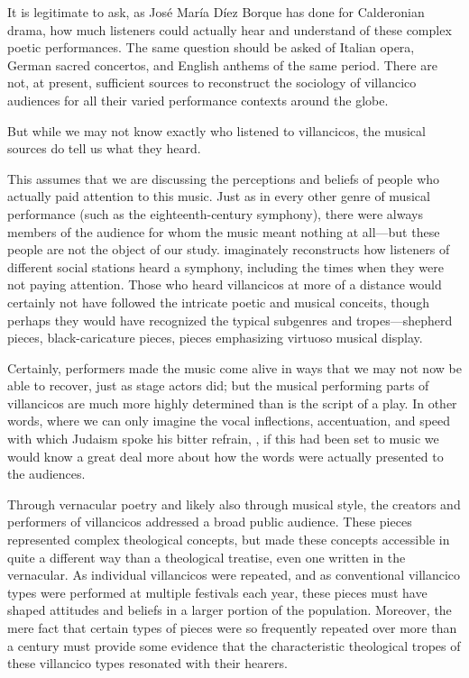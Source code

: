 It is legitimate to ask, as José María Díez Borque has done for Calderonian drama, how much listeners could actually hear and understand of these complex poetic performances.%
  \autocite{DiezBorque:Publico}
The same question should be asked of Italian opera, German sacred concertos, and English anthems of the same period.
There are not, at present, sufficient sources to reconstruct the sociology of villancico audiences for all their varied performance contexts around the globe.

But while we may not know exactly who listened to villancicos, the musical sources do tell us what they heard.%
  \begin{Footnote}
  This assumes that we are discussing the perceptions and beliefs of people who actually paid attention to this music.
  Just as in every other genre of musical performance (such as the eighteenth-century symphony), there were always members of the audience for whom the music meant nothing at all---but these people are not the object of our study.
  \autocite{Lowe:PleasureSymphony} imaginately reconstructs how listeners of different social stations heard a symphony, including the times when they were not paying attention.
  Those who heard villancicos at more of a distance would certainly not have followed the intricate poetic and musical conceits, though perhaps they would have recognized the typical subgenres and tropes---shepherd pieces, black-caricature pieces, pieces emphasizing virtuoso musical display.
  \end{Footnote}
Certainly, performers made the music come alive in ways that we may not now be able to recover, just as stage actors did; but the musical performing parts of villancicos are much more highly determined than is the script of a play.
In other words, where we can only imagine the vocal inflections, accentuation, and speed with which Judaism spoke his bitter refrain, , if this had been set to music we would know a great deal more about how the words were actually presented to the audiences.

Through vernacular poetry and likely also through musical style, the creators and performers of villancicos addressed a broad public audience.
These pieces represented complex theological concepts, but made these concepts accessible in quite a different way than a theological treatise, even one written in the vernacular.
As individual villancicos were repeated, and as conventional villancico types were performed at multiple festivals each year, these pieces must have shaped attitudes and beliefs in a larger portion of the population.
Moreover, the mere fact that certain types of pieces were so frequently repeated over more than a century must provide some evidence that the characteristic theological tropes of these villancico types resonated with their hearers.

